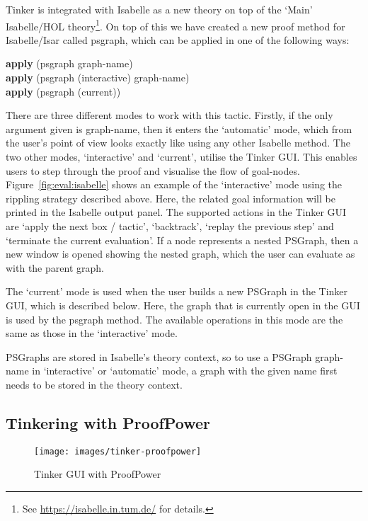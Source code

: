 \documentclass[submission,copyright,creativecommons]{eptcs}
\begin{document}
Tinker is integrated with Isabelle as a new theory on top of the 
`Main' Isabelle/HOL theory\footnote{See \url{https://isabelle.in.tum.de/} for details.}. 
On top of this we have created a new proof method for Isabelle/Isar called
\textsf{psgraph}, which can be applied in one of the following ways:
\begin{tabbing}
\sf\qquad\quad\textbf{apply} (psgraph graph-name)\\
\sf\qquad\quad\textbf{apply} (psgraph (interactive) graph-name)\\
\sf\qquad\quad\textbf{apply} (psgraph (current))
\end{tabbing}
There are three different modes to work with this tactic. Firstly, if the only argument given is graph-name, then it enters the `automatic' mode, which from the user's point of view looks exactly like using any other Isabelle method. The two other modes, `interactive' and `current', utilise the Tinker GUI. This enables users to step through the proof and visualise the flow of goal-nodes. Figure~\ref{fig:eval:isabelle} shows an example of the `interactive' mode using the rippling strategy described above. Here, the related goal information will be printed in the Isabelle output panel. The supported actions in the Tinker GUI are `apply the next box / tactic', `backtrack', `replay the previous step' and `terminate the current evaluation'. If a node represents a nested PSGraph, then a new window is opened showing the nested graph, which the user can evaluate as with the parent graph.

The `current' mode is used when the user builds a new PSGraph in the Tinker GUI, which is described below. Here, the graph that is currently open in the GUI is used by the \textsf{psgraph} method. The available operations in this mode are the same as those in the `interactive' mode.  

PSGraphs are stored in Isabelle's theory context, so to use a PSGraph \textsf{graph-name} in `interactive' or `automatic' mode, a graph with the given name first needs to be stored in the theory context.



\subsection{Tinkering with ProofPower}

\begin{figure}
\begin{center}
\centering
\texttt{[image: images/tinker-proofpower]}
\end{center}
\vspace{-15pt}
\caption{Tinker GUI with ProofPower}\label{fig:eval:pp}
\end{figure}
\end{document}

